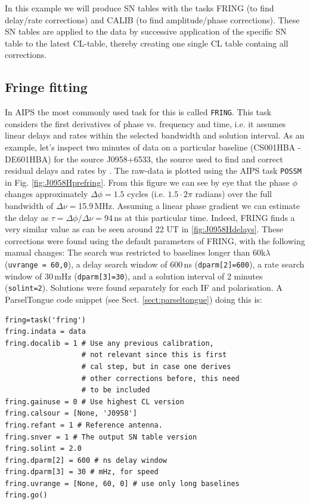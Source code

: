 In this example we will produce SN tables with the tasks FRING (to find delay/rate corrections)
and CALIB (to find amplitude/phase corrections). These SN tables are applied to the data by
successive application of the specific SN table to the latest CL-table, thereby creating one single
CL table containg all corrections.

\subsection{Fringe fitting}
\label{sect:fringecal}
In AIPS the most commonly used task for this is called \verb!FRING!. This task
considers the first derivatives of phase vs. frequency and time, i.e. it
assumes linear delays and rates within the selected bandwidth and solution
interval.  
As an example, let's inspect two minutes of data on a particular baseline
(CS001HBA - DE601HBA) for the source J0958+6533, the source used to find and
correct residual delays and rates by \cite{varenius2014}.  The raw-data is
plotted using the AIPS task \verb!POSSM!  in Fig. \ref{fig:J0958Hprefring}.
From this figure we can see by eye that the phase $\phi$ changes approximately
$\Delta \phi=1.5$ cycles (i.e.  $1.5\cdot2\pi$ radians) over the full bandwidth
of $\Delta \nu=$15.9\,MHz.  Assuming a linear phase gradient we can estimate
the delay as $\tau = \Delta \phi / \Delta \nu=94$\,ns at this particular time.
Indeed, FRING finds a very similar value as can be seen around 22 UT in
\ref{fig:J0958Hdelays}.  These corrections were found using the default
parameters of FRING, with the following manual changes: The search was
restricted to baselines longer than 60k$\lambda$ (\verb!uvrange = 60,0!), a
delay search window of 600\,ns (\verb!dparm[2]=600!), a rate search window of
30\,mHz (\verb!dparm[3]=30!), and a solution interval of 2 minutes
(\verb!solint=2!).  Solutions were found separately for each IF and
polarisation. A ParselTongue code snippet (see Sect. \ref{sect:parseltongue})
doing this is:
\begin{lstlisting}
fring=task('fring')
fring.indata = data
fring.docalib = 1 # Use any previous calibration,
                  # not relevant since this is first
                  # cal step, but in case one derives
                  # other corrections before, this need
                  # to be included
fring.gainuse = 0 # Use highest CL version
fring.calsour = [None, 'J0958']
fring.refant = 1 # Reference antenna.
fring.snver = 1 # The output SN table version
fring.solint = 2.0
fring.dparm[2] = 600 # ns delay window
fring.dparm[3] = 30 # mHz, for speed
fring.uvrange = [None, 60, 0] # use only long baselines
fring.go()
\end{lstlisting}


